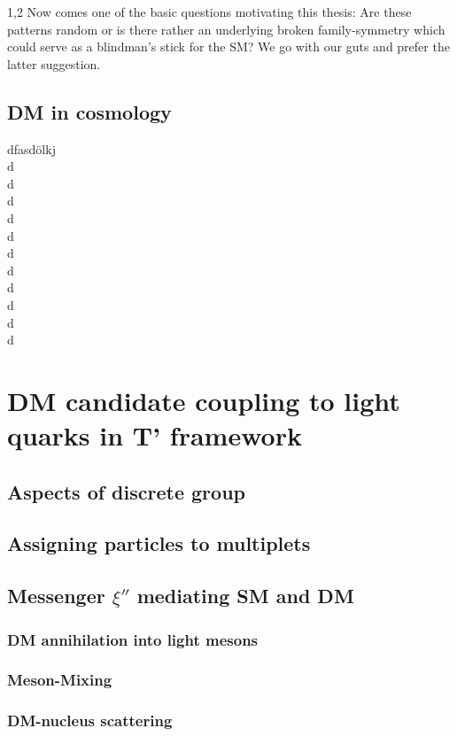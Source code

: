 \documentclass[11pt,a4paper,twoside]{article}
\begin{document}
\begin{spacing}{1,2}
Now comes one of the basic questions motivating this thesis: Are these patterns random or is there rather an underlying broken family-symmetry which
could serve as a blindman's stick for the SM? We go with our guts and prefer the latter suggestion.

\subsection{DM in cosmology}
dfasdölkj\\d\\d\\d\\d\\d\\d\\d\\d\\d\\d\\d

\section{DM candidate coupling to light quarks in T' framework}
\subsection{Aspects of discrete group}
\subsection{Assigning particles to multiplets}
\subsection{Messenger $\xi''$ mediating SM and DM}
\subsubsection{DM annihilation into light mesons}
\subsubsection{Meson-Mixing}
\subsubsection{DM-nucleus scattering}


\newpage\listoffigures\newpage
{}
\listoftables\newpage
\end{spacing}
\end{document}
